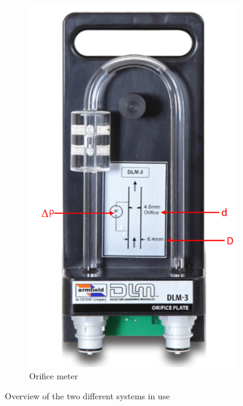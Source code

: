 \begin{figure}[h!]
\begin{subfigure}{0.435\columnwidth}
    \includegraphics[width=\linewidth]{Diagrams/Orifice.jpeg}
    \caption{Orifice meter} 
    \label{fig:Orifice}
  \end{subfigure}%

\label{fig:setup}
\caption{Overview of the two different systems in use} \label{fig:Meters}
\end{figure}
